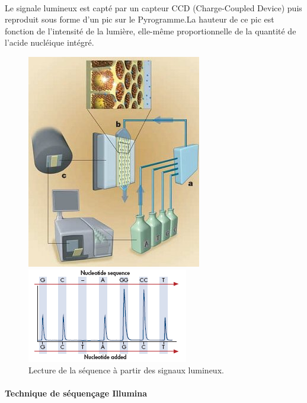 ~~\\
Le signale lumineux est capté par un capteur CCD (Charge-Coupled Device) puis reproduit sous forme d’un pic sur le Pyrogramme.La hauteur de ce pic est fonction de l'intensité de la lumière, elle-même proportionnelle de la quantité de l'acide nucléique intégré.
\begin{figure}[!h]
   \begin{minipage}[b]{0.40\linewidth}
      \centering \includegraphics[scale=0.5]{Images/mach.png}
   \end{minipage}\hfill
   \begin{minipage}[b]{0.48\linewidth}   
      \centering \includegraphics[scale=0.7]{Images/sign.png}
   \end{minipage}
   \caption{Lecture de la séquence à partir des signaux lumineux.}
\end{figure}
\paragraph*{Technique de séquençage Illumina}
~~\\

